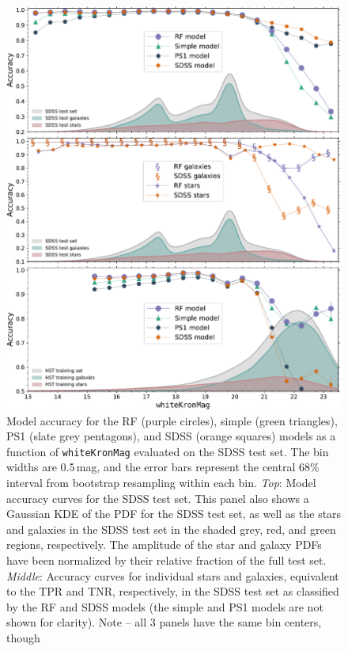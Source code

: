 \documentclass[twocolumn]{aastex62}
\begin{document}
\begin{figure}[htb]
 \centering
  \includegraphics[width=6.2in]{./Figures/SDSS_acc_mag.pdf}
  \caption{ Model accuracy for the RF (purple circles), simple (green
  triangles), PS1 (slate grey pentagons), and SDSS (orange squares) models
  as a function of \texttt{whiteKronMag} evaluated on the SDSS test set. The
  bin widths are 0.5\,mag, and the error bars represent the central 68\%
  interval from bootstrap resampling within each bin.
  \textit{Top}: Model accuracy curves for the SDSS test set. This panel also
  shows a Gaussian KDE of the PDF for the SDSS test set, as well as the
  stars and galaxies in the SDSS test set in the shaded grey, red, and green
  regions, respectively. The amplitude of the star and galaxy PDFs have been
  normalized by their relative fraction of the full test set.
  \textit{Middle}: Accuracy curves for individual stars and galaxies,
  equivalent to the TPR and TNR, respectively, in the SDSS test set as
  classified by the RF and SDSS models (the simple and PS1 models are not
  shown for clarity). Note -- all 3 panels have the same bin centers, though
}
\end{figure}
\end{document}
